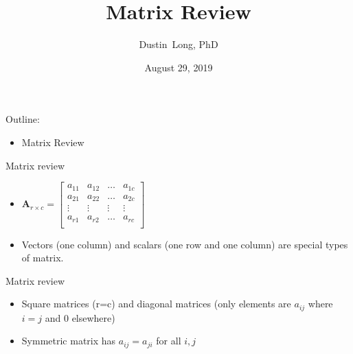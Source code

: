 \documentclass[handout,x11names,unknownkeysallowed]{beamer}
\title[] %
{Matrix Review}
\author[Dustin Long, PhD] %
{Dustin~Long, PhD}
\institute[UAB]
{
  Department of Biostatistics\\
	University of Alabama at Birmingham

}
\date[Matrix Review]{August 29, 2019}
\begin{document}
\begin{frame}
  \titlepage
\end{frame}

\begin{frame}
Outline:
\begin{itemize}
\item Matrix Review
\end{itemize}

\end{frame}




\begin{frame}
Matrix review
\begin{itemize}
\item $\bm{A}_{r \times c} = \left[ \begin{array}{cccc}
													a_{11} & a_{12} & \ldots & a_{1c}\\
													a_{21} & a_{22} & \ldots & a_{2c}\\
													\vdots & \vdots & \vdots & \vdots \\
													a_{r1} & a_{r2} & \ldots & a_{rc}\\ 
													\end{array}\right]$
													
\item Vectors (one column) and scalars (one row and one column) are special types of matrix.
\end{itemize}
\end{frame}





\begin{frame}
Matrix review
\begin{itemize}
\item Square matrices (r=c) and diagonal matrices (only elements are $a_{ij}$ where $i=j$ and 0 elsewhere)
\item Symmetric matrix has $a_{ij} = a_{ji}$ for all $i, j$
\end{itemize}
\end{frame}
\end{document}
